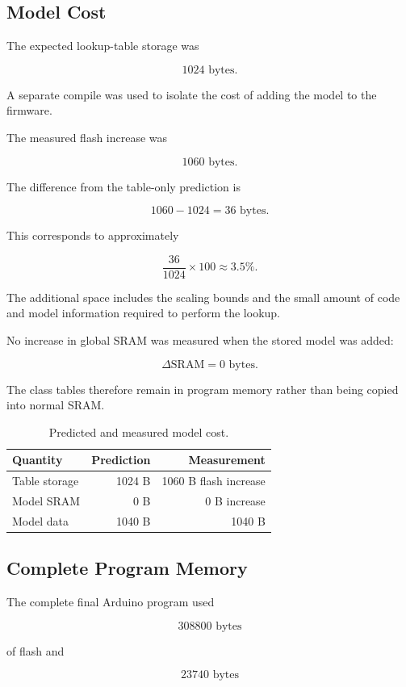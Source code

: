 \documentclass[10pt,a4paper,twocolumn]{article}
\begin{document}
\subsection{Model Cost}

The expected lookup-table storage was

\[
1024\text{ bytes}.
\]

A separate compile was used to isolate the cost of adding the model to the
firmware.

The measured flash increase was

\[
1060\text{ bytes}.
\]

The difference from the table-only prediction is

\[
1060-1024=36\text{ bytes}.
\]

This corresponds to approximately

\[
\frac{36}{1024}\times100
\approx3.5\%.
\]

The additional space includes the scaling bounds and the small amount of code
and model information required to perform the lookup.

No increase in global SRAM was measured when the stored model was added:

\[
\Delta\text{SRAM}=0\text{ bytes}.
\]

The class tables therefore remain in program memory rather than being copied
into normal SRAM.

\begin{table}[H]
\centering
\caption{Predicted and measured model cost.}
\label{tab:cost}
\begin{tabular}{lrr}
\toprule
Quantity & Prediction & Measurement \\
\midrule
Table storage & 1024 B & 1060 B flash increase \\
Model SRAM & 0 B & 0 B increase \\
Model data & 1040 B & 1040 B \\
\bottomrule
\end{tabular}
\end{table}


\subsection{Complete Program Memory}

The complete final Arduino program used

\[
308800\text{ bytes}
\]

of flash and

\[
23740\text{ bytes}
\]
\end{document}
